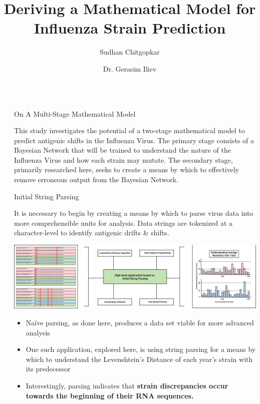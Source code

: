 \documentclass[final]{beamer}
\title{Deriving a Mathematical Model for Influenza Strain Prediction}
\author{Sudhan Chitgopkar \and Dr. Gerasim Iliev}
\institute[shortinst]{University of Georgia, Dept. of Mathematics}
\newlength{\sepwidth}
\newlength{\colwidth}
\newcommand{\separatorcolumn}{\begin{column}{\sepwidth}\end{column}}
\begin{document}
\begin{frame}[t]
\begin{columns}[t]
\separatorcolumn

\begin{column}{\colwidth}

  \begin{alertblock}{On A Multi-Stage Mathematical Model}

    This study investigates the potential of a two-stage mathematical model to predict antigenic shifts in the Influenza Virus. The primary stage consists of a Bayesian Network that will be trained to understand the nature of the Influenza Virus and how each strain may mutate. The secondary stage, primarily researched here, seeks to create a means by which to effectively remove erroneous output from the Bayesian Network. 

  \end{alertblock}

  \begin{block}{Initial String Parsing}
  
    It is necessary to begin by creating a means by which to parse virus data into more comprehensible units for analysis. Data strings are tokenized at a character-level to identify antigenic drifts \& shifts.
    \vspace{0.2 in}
    \begin{center}
    \includegraphics[width = \textwidth]{StringParsing.pdf}
    \end{center}

    \begin{itemize}
      \item Naïve parsing, as done here, produces a data set viable for more advanced analysis
      \item One such application, explored here, is using string parsing for a means by which to understand the Levenshtein’s Distance of each year’s strain with its predecessor
      \item Interestingly, parsing indicates that \textbf{strain discrepancies occur towards the beginning of their RNA sequences.}
    \end{itemize}
  \end{block}


\end{column}
\end{columns}
\end{frame}
\end{document}
